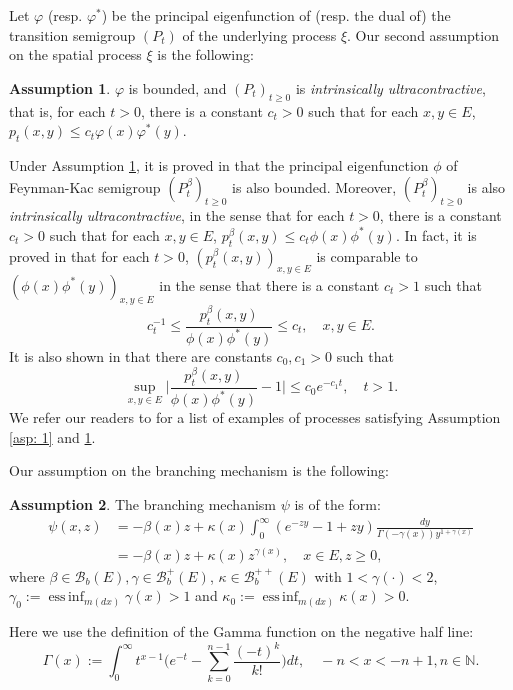 \documentclass[12pt, a4paper]{amsart}
\theoremstyle{definition}
\newtheorem{asp}{Assumption}
\numberwithin{equation}{section}
\begin{document}
	Let $\varphi$ (resp. $\varphi^*$) be the principal eigenfunction of (resp. the dual of) the transition semigroup $(P_t)$ of the underlying process $\xi$.
	Our second assumption on the spatial process $\xi$ is the following:

\begin{asp} \label{asp: 3}
	$\varphi$ is bounded, and $(P_t)_{t\geq 0}$ is \emph{intrinsically ultracontractive}, that is, for each $t>0$, there is a constant $c_t >0$ such that for each $x,y\in E$, $p_t(x,y) \leq c_t \varphi(x) \varphi^*(y)$.
\end{asp}
	
	Under Assumption \ref{asp: 3}, it is proved in \cite{RenSongZhang2015Limit, RenSongZhang2017Central} that the principal eigenfunction $\phi$ of Feynman-Kac semigroup $(P^\beta_t)_{t\geq 0}$ is also bounded.
	Moreover, $(P^\beta_t)_{t\geq 0}$ is also \emph{intrinsically ultracontractive}, in the sense that for each $t>0$, there is a constant $c_t >0$ such that for each $x,y\in E$, $p^\beta_t(x,y) \leq c_t \phi(x) \phi^*(y)$.
	In fact, it is proved in \cite{KimSong2008Intrinsic} that for each $t>0$, $(p^\beta_t(x,y))_{x,y\in E}$ is comparable to $(\phi(x)\phi^*(y))_{x,y\in E}$ in the sense that there is a constant $c_t > 1$ such that
\begin{equation}\label{eq: p-t-beta is comparable to phi phi-star}
	c_t^{-1}
	\leq \frac {p^\beta_t(x,y)} {\phi(x)\phi^*(y)}
	\leq c_t,
	\quad x,y \in E.
\end{equation}
    It is also shown in \cite{KimSong2008Intrinsic} that there are constants $c_0, c_1 > 0$ such that
\begin{equation}\label{eq:q(t,x,y)}
	\sup_{x,y\in E} \Big|\frac{p^\beta_t(x,y)}{\phi(x)\phi^*(y)} - 1 \Big| 
	\leq c_0 e^{-c_1 t},
	\quad t > 1.
\end{equation}
	We refer our readers to \cite{RenSongZhang2015Limit} for a list of examples of processes satisfying Assumption \ref{asp: 1} and \ref{asp: 3}.

	Our assumption on the branching mechanism is the following:
\begin{asp} \label{asp: 4}
	The branching mechanism $\psi$ is of the form:
\begin{equation}\begin{split}
	\psi(x,z)
	&= - \beta(x) z + \kappa(x) \int_0^\infty (e^{-z y} - 1+ z y) \frac{dy}{\Gamma(- \gamma(x)) y^{1+ \gamma(x)}}
	\\&= -\beta (x) z + \kappa(x) z^{\gamma(x)},
	\quad x\in E, z \geq 0,
\end{split}\end{equation}
	where $\beta \in \mathscr B_b(E), \gamma \in \mathscr B^+_b(E)$, $\kappa \in \mathscr B^{++}_b(E)$ with $1< \gamma(\cdot )<2$, $\gamma_0 := \operatorname{ess\,inf}_{m(dx)} \gamma(x)> 1$ and $\kappa_0:=\operatorname{ess\,inf}_{m(dx)}\kappa(x) > 0$.
\end{asp}
	Here we use the definition of the Gamma function on the negative half line:
\begin{equation}\label{eq: definition of Gamma function}
	\Gamma(x)
	:= \int_0^\infty t^{x-1} \Big(e^{-t} - \sum_{k=0}^{n-1} \frac{(-t)^k}{k!}\Big) dt,
	\quad -n< x< -n+1, n\in \mathbb N.
\end{equation}
	
\end{document}
